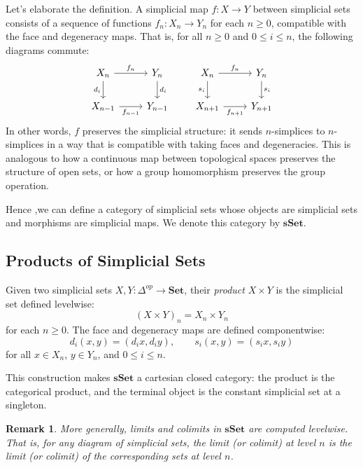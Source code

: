 \documentclass[11pt]{article}
\theoremstyle{definition}
\theoremstyle{plain}
\newtheorem{remark}[definition]{Remark}
\begin{document}
Let's elaborate the definition. A simplicial map $f : X \to Y$ between simplicial sets consists of a sequence of functions $f_n : X_n \to Y_n$ for each $n \geq 0$, compatible with the face and degeneracy maps. That is, for all $n \geq 0$ and $0 \leq i \leq n$, the following diagrams commute:
\[
    \begin{tikzcd}
        X_n \arrow[r,"f_n"] \arrow[d,"d_i"'] & Y_n \arrow[d,"d_i"] \\
        X_{n-1} \arrow[r,"f_{n-1}"'] & Y_{n-1}
    \end{tikzcd}
    \qquad
    \begin{tikzcd}
        X_n \arrow[r,"f_n"] \arrow[d,"s_i"'] & Y_n \arrow[d,"s_i"] \\
        X_{n+1} \arrow[r,"f_{n+1}"'] & Y_{n+1}
    \end{tikzcd}
\]
In other words, $f$ preserves the simplicial structure: it sends $n$-simplices to $n$-simplices in a way that is compatible with taking faces and degeneracies. This is analogous to how a continuous map between topological spaces preserves the structure of open sets, or how a group homomorphism preserves the group operation.


Hence ,we can define a category of simplicial sets whose objects are simplicial sets and morphisms are simplicial maps. We denote this category by $\mathbf{sSet}$.


\subsection{Products of Simplicial Sets}

Given two simplicial sets $X, Y : \Delta^{op} \to \mathbf{Set}$, their \emph{product} $X \times Y$ is the simplicial set defined levelwise:
\[
    (X \times Y)_n = X_n \times Y_n
\]
for each $n \geq 0$. The face and degeneracy maps are defined componentwise:
\[
    d_i(x, y) = (d_i x, d_i y), \qquad s_i(x, y) = (s_i x, s_i y)
\]
for all $x \in X_n$, $y \in Y_n$, and $0 \leq i \leq n$.

This construction makes $\mathbf{sSet}$ a cartesian closed category: the product is the categorical product, and the terminal object is the constant simplicial set at a singleton.

\begin{remark}
    More generally, limits and colimits in $\mathbf{sSet}$ are computed levelwise. That is, for any diagram of simplicial sets, the limit (or colimit) at level $n$ is the limit (or colimit) of the corresponding sets at level $n$.
\end{remark}
\end{document}
